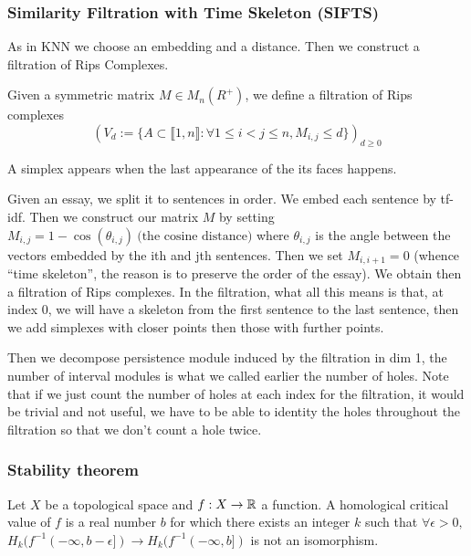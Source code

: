 \subsubsection{Similarity Filtration with Time Skeleton (SIFTS) \cite{Zhu_2013}}
\label{sifts}
As in KNN we choose an embedding and a
distance. Then we construct a filtration of Rips Complexes.

\begin{definition}
  Given a symmetric matrix $M \in M_n(R^+)$, we define a filtration of Rips complexes
  $$
  (V_d := \{A \subset \llbracket 1, n\rrbracket :
  \forall 1\le i<j\le n, M_{i, j} \le d\})_{d\ge 0}
  $$
\end{definition}
\RM A simplex appears when the last appearance of the its faces happens.

Given an essay, we split it to sentences in order. We embed each sentence by tf-idf.
Then we construct our matrix $M$ by setting $M_{i, j} = 1-\cos(\theta_{i,j})~\text{(the cosine distance)}$
where $\theta_{i, j}$ is the angle between the vectors embedded by the ith and jth sentences.
Then we set $M_{i, i+1} = 0$ (whence ``time skeleton'', the reason is
to preserve the order of the essay). We obtain then
a filtration of Rips complexes.
In the filtration, what all this means is that,
at index 0, we will have a skeleton from the first sentence to the last sentence,
then we add simplexes with closer points then those with further points.

Then we decompose persistence module induced by the filtration in dim 1,
the number of interval modules is what we called earlier the number of holes.
Note that if we just count the number of holes at each index for the filtration,
it would be trivial and not useful, we have to be able to identity the holes
throughout the filtration so that we don't count a hole twice.

\subsubsection{Stability theorem}

\newcommand{\Dg}{\mathrm{Dg}}

\begin{definition}
  Let $X$ be a topological space and $f : X \to \mathbb{R}$ a function.
  A homological critical value of $f$ is a real number $b$ for which
  there exists an integer $k$ such that $\forall \epsilon > 0, $
  $H_k(f^{-1}(-\infty, b-\epsilon]) \to H_k(f^{-1}(-\infty, b])$ is not
  an isomorphism.
\end{definition}

